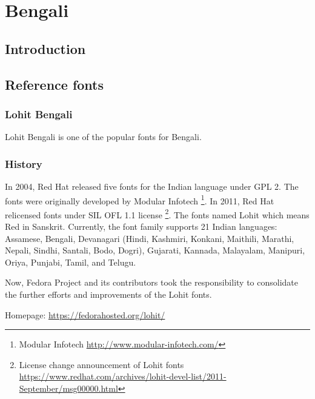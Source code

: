 \chapter{Bengali}
\section{Introduction}

\section{Reference fonts}

\subsection{Lohit Bengali}

Lohit Bengali is one of the popular fonts for Bengali.

\subsection{History}
In 2004, Red Hat released five fonts for the Indian language under GPL 2.
The fonts were originally developed by Modular Infotech
\footnote{Modular Infotech \url{http://www.modular-infotech.com/}}.
In 2011, Red Hat relicensed fonts under SIL OFL 1.1 license
\footnote{License change announcement of Lohit fonts
\url{https://www.redhat.com/archives/lohit-devel-list/2011-September/msg00000.html}}.
The fonts named Lohit which means Red in Sanskrit. Currently, the font family
supports 21 Indian languages: Assamese, Bengali, Devanagari (Hindi, Kashmiri,
Konkani, Maithili, Marathi, Nepali, Sindhi, Santali, Bodo, Dogri), Gujarati,
Kannada, Malayalam, Manipuri, Oriya, Punjabi, Tamil, and Telugu.

Now, Fedora Project and its contributors took the responsibility to consolidate
the further efforts and improvements of the Lohit fonts.

Homepage: {\url{https://fedorahosted.org/lohit/}}
